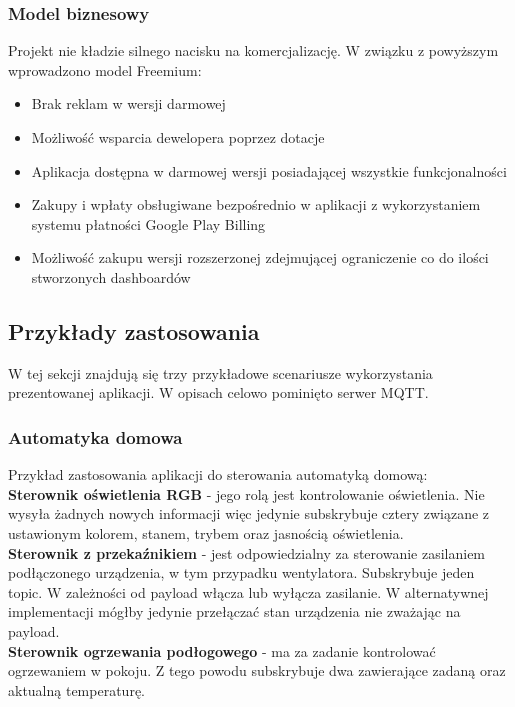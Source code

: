 \subsubsection{Model biznesowy}
Projekt nie kładzie silnego nacisku na komercjalizację. W związku z powyższym wprowadzono model Freemium:
\begin{itemize}[leftmargin=*]
    \item Brak reklam w wersji darmowej
    \item Możliwość wsparcia dewelopera poprzez dotacje
    \item Aplikacja dostępna w darmowej wersji posiadającej wszystkie funkcjonalności
    \item Zakupy i wpłaty obsługiwane bezpośrednio w aplikacji z wykorzystaniem systemu płatności Google Play Billing
    \item Możliwość zakupu wersji rozszerzonej zdejmującej ograniczenie co do ilości stworzonych dashboardów
\end{itemize}

\newpage

\subsection{Przykłady zastosowania}
W tej sekcji znajdują się trzy przykładowe scenariusze wykorzystania prezentowanej aplikacji. W opisach celowo pominięto serwer MQTT.

\subsubsection{Automatyka domowa}
Przykład zastosowania aplikacji do sterowania automatyką domową:\\

\textbf{Sterownik oświetlenia RGB} - jego rolą jest kontrolowanie oświetlenia. Nie wysyła żadnych nowych informacji więc jedynie subskrybuje cztery  związane z ustawionym kolorem, stanem, trybem oraz jasnością oświetlenia.\\

\textbf{Sterownik z przekaźnikiem} - jest odpowiedzialny za sterowanie zasilaniem podłączonego urządzenia, w tym przypadku wentylatora. Subskrybuje jeden topic. W zależności od payload włącza lub wyłącza zasilanie. W alternatywnej implementacji mógłby jedynie przełączać stan urządzenia nie zważając na payload.\\

\textbf{Sterownik ogrzewania podłogowego} - ma za zadanie kontrolować ogrzewaniem w pokoju. Z tego powodu subskrybuje dwa  zawierające zadaną oraz aktualną temperaturę.\\

